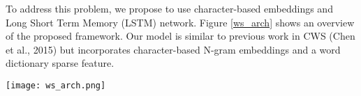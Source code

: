 \documentclass[11pt,letterpaper]{article}
\begin{document}
To address this problem, we propose to use character-based embeddings and Long Short Term Memory (LSTM) network.
Figure \ref{ws_arch} shows an overview of the proposed framework. Our model is similar to previous work in CWS (Chen et al., 2015) but incorporates character-based N-gram embeddings and a word dictionary sparse feature. 
 
 \begin{figure*}[t]    
 \begin{center}    
 \texttt{[image: ws\_arch.png]}              
 \caption{Overview of our LSTM for Japanese word segmentation.}    
 \label{ws_arch}    
\end{center}    
\end{figure*}


 
\end{document}
